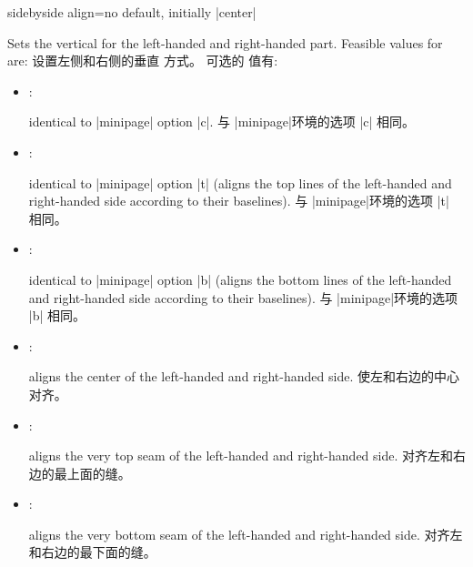 \begin{docTcbKey}[][doc updated=2015-02-06]{sidebyside align}{=}{no default, initially |center|}
\begin{stripedbox}
Sets the vertical  for the left-handed and right-handed part.%
Feasible values for  are:
\tcblower
设置左侧和右侧的垂直  方式。%
可选的  值有:
\end{stripedbox}

\begin{itemize}
    \item{}: \begin{stripedbox}
identical to |minipage| option |c|.
\tcblower
与 |minipage|环境的选项 |c| 相同。
\end{stripedbox}
  
  
  \item{}:    
\begin{stripedbox}
identical to |minipage| option |t| (aligns the top lines of the left-handed and right-handed side according to their baselines).
\tcblower
与 |minipage|环境的选项 |t| 相同。%
\end{stripedbox}
  
\item{}: 
\begin{stripedbox}
identical to |minipage| option |b| (aligns the bottom lines of the left-handed and right-handed side according to their baselines).
\tcblower
与 |minipage|环境的选项 |b| 相同。%
\end{stripedbox}

  \item{}: 
\begin{stripedbox}
aligns the center of the left-handed and right-handed side.
\tcblower
使左和右边的中心对齐。
\end{stripedbox}

  \item{}:    
\begin{stripedbox}
aligns the very top seam of the left-handed and right-handed side.
\tcblower
对齐左和右边的最上面的缝。
\end{stripedbox}
  
  \item{}: 
\begin{stripedbox}
aligns the very bottom seam of the left-handed and right-handed side.
\tcblower
对齐左和右边的最下面的缝。
\end{stripedbox}
\end{itemize}


\end{docTcbKey}
